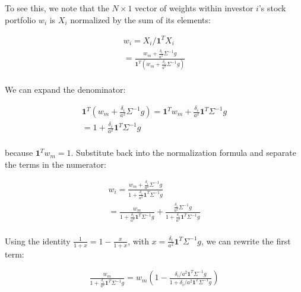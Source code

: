 To see this, we note that the $N \times 1$ vector 
of weights within investor $i$'s stock portfolio $w_i$ is
$X_i$ normalized by the sum of its elements:

\begin{equation}
    \begin{aligned}
        w_i = X_i / \mathbf{1}^T X_i \\
        = \frac{w_m + \frac{\delta_i}{a^2} \Sigma^{-1} g}{\mathbf{1}^T (w_m + \frac{\delta_i}{a^2} \Sigma^{-1} g)} \\
    \end{aligned}
\end{equation}

We can expand the denominator:

\begin{equation}
    \begin{aligned}
        \mathbf{1}^T (w_m + \frac{\delta_i}{a^2} \Sigma^{-1} g) = \mathbf{1}^T w_m + \frac{\delta_i}{a^2} \mathbf{1}^T \Sigma^{-1} g \\
        = 1 + \frac{\delta_i}{a^2} \mathbf{1}^T \Sigma^{-1} g\\
    \end{aligned}
\end{equation}

because $\mathbf{1}^T w_m = 1$.
Substitute back into the normalization formula
and separate the terms in the numerator:

\begin{equation}
    \begin{aligned}
        w_i = \frac{w_m + \frac{\delta_i}{a^2} \Sigma^{-1} g}{1 + \frac{\delta_i}{a^2} \mathbf{1}^T \Sigma^{-1} g} \\
        = \frac{w_m}{1 + \frac{\delta_i}{a^2} \mathbf{1}^T \Sigma^{-1} g} + \frac{\frac{\delta_i}{a^2} \Sigma^{-1} g}{1 + \frac{\delta_i}{a^2} \mathbf{1}^T \Sigma^{-1} g} \\
    \end{aligned}
\end{equation}

Using the identity $\frac{1}{1 + x} = 1 - \frac{x}{1 + x}$, 
with $x = \frac{\delta_i}{a^2} \mathbf{1}^T \Sigma^{-1} g$,
we can rewrite 
the first term:

\begin{equation}
    \begin{aligned}
        \frac{w_m}{1 + \frac{\delta_i}{a^2} \mathbf{1}^T \Sigma^{-1} g} = w_m (1 - \frac{\delta_i / a^2 \mathbf{1}^T \Sigma^{-1}g}{1 + \delta_i / a^2 \mathbf{1}^T \Sigma^{-1}g}) \\
    \end{aligned}
\end{equation}

